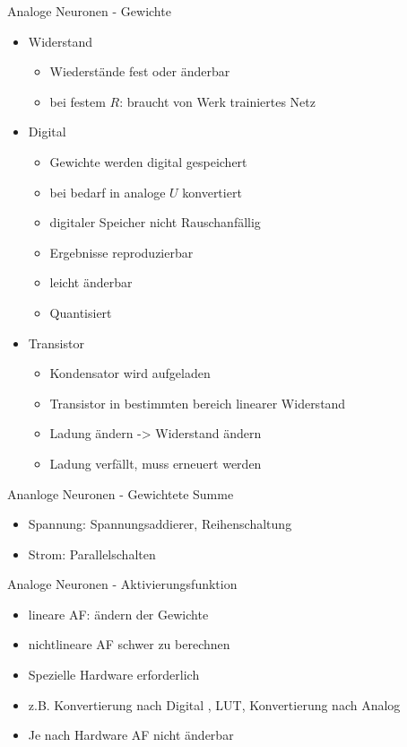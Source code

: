 \documentclass[handout]{beamer}
\begin{document}
    \begin{frame}{Analoge Neuronen - Gewichte}
        \begin{itemize}[<+->]
            \item Widerstand
            \begin{itemize}
                \item Wiederstände fest oder änderbar
                \item bei festem $R$: braucht von Werk trainiertes Netz
            \end{itemize}
            \item Digital
            \begin{itemize}
                \item Gewichte werden digital gespeichert
                \item bei bedarf in analoge $U$ konvertiert
                \item digitaler Speicher nicht Rauschanfällig
                \item Ergebnisse reproduzierbar
                \item leicht änderbar
                \item Quantisiert
            \end{itemize}
            \item Transistor
            \begin{itemize}
                \item Kondensator wird aufgeladen
                \item Transistor in bestimmten bereich linearer Widerstand
                \item Ladung ändern -> Widerstand ändern
                \item Ladung verfällt, muss erneuert werden
            \end{itemize}
        \end{itemize}
    \end{frame}

    \begin{frame}{Ananloge Neuronen - Gewichtete Summe}
        \begin{itemize}[<+->]
            \item Spannung: Spannungsaddierer, Reihenschaltung
            \item Strom: Parallelschalten
        \end{itemize}
    \end{frame}

    \begin{frame}{Analoge Neuronen - Aktivierungsfunktion}
        \begin{itemize}[<+->]
            \item lineare AF: ändern der Gewichte
            \item nichtlineare AF schwer zu berechnen
            \item Spezielle Hardware erforderlich
            \item z.B. Konvertierung nach Digital , LUT, Konvertierung nach Analog
            \item Je nach Hardware AF nicht änderbar
        \end{itemize}
    \end{frame}
\end{document}
